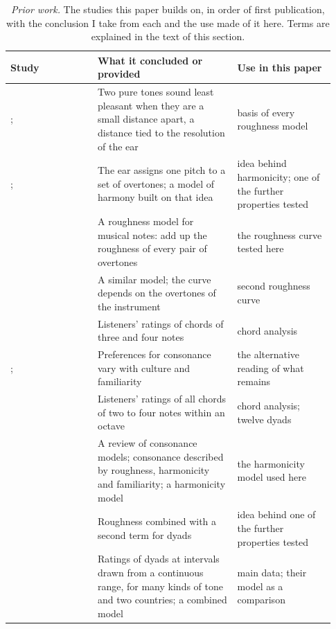 \documentclass[11pt,a4paper]{article}
\begin{document}
\begin{table}[t]
\centering
\caption{\emph{Prior work.} The studies this paper builds on, in order of first publication, with the
conclusion I take from each and the use made of it here. Terms are explained in the text of
this section.}
\label{tab:landscape}
\footnotesize
\begin{tabular}{@{}>{\raggedright\arraybackslash}p{0.25\linewidth}>{\raggedright\arraybackslash}p{0.40\linewidth}>{\raggedright\arraybackslash}p{0.28\linewidth}@{}}
\toprule
Study & What it concluded or provided & Use in this paper \\
\midrule
\citet{plomp1965}; \citet{kameoka1969a} & Two pure tones sound least pleasant when they are a small distance apart, a distance tied to the resolution of the ear & basis of every roughness model \\
\citet{terhardt1974}; \citet{parncutt1989} & The ear assigns one pitch to a set of overtones; a model of harmony built on that idea & idea behind harmonicity; one of the further properties tested \\
\citet{hutchinson1978} & A roughness model for musical notes: add up the roughness of every pair of overtones & the roughness curve tested here \\
\citet{sethares1993,sethares2005} & A similar model; the curve depends on the overtones of the instrument & second roughness curve \\
\citet{johnsonlaird2012} & Listeners' ratings of chords of three and four notes & chord analysis \\
\citet{mcdermott2016}; \citet{lahdelma2022} & Preferences for consonance vary with culture and familiarity & the alternative reading of what remains \\
\citet{bowling2018} & Listeners' ratings of all chords of two to four notes within an octave & chord analysis; twelve dyads \\
\citet{harrison2018,harrison2020} & A review of consonance models; consonance described by roughness, harmonicity and familiarity; a harmonicity model & the harmonicity model used here \\
\citet{masina2022} & Roughness combined with a second term for dyads & idea behind one of the further properties tested \\
\citet{marjieh2024} & Ratings of dyads at intervals drawn from a continuous range, for many kinds of tone and two countries; a combined model & main data; their model as a comparison \\
\bottomrule
\end{tabular}
\end{table}
\end{document}

